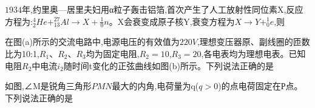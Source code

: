 \question[6]$1934$年,约里奥—居里夫妇用α粒子轰击铝箔,首次产生了人工放射性同位素X,反应方程为:$_{2}^{4}He+_{13}^{27}Al\rightarrow X+\frac{1}{0}n$。X会衰变成原子核Y,衰变方程为$X→Y+_0^1e$,则
\begin{solution}{4cm}

\end{solution}



\question[6]在图(a)所示的交流电路中,电源电压的有效值为$220V$,理想变压器原、副线圈的匝数比为10:1,$R_1$、$R_2$、$R_3$均为固定电阻,$R_2=10$,$R_3=20$,各电表均为理想电表。已知电阻$R_2$中电流$i_2$随时间t变化的正弦曲线如图(b)所示。下列说法正确的是
\begin{solution}{4cm}

\end{solution}



\question[6]如图,∠M是锐角三角形$PMN$最大的内角,电荷量为q($q>0$)的点电荷固定在Р点。下列说法正确的是
\begin{solution}{4cm}

\end{solution}



